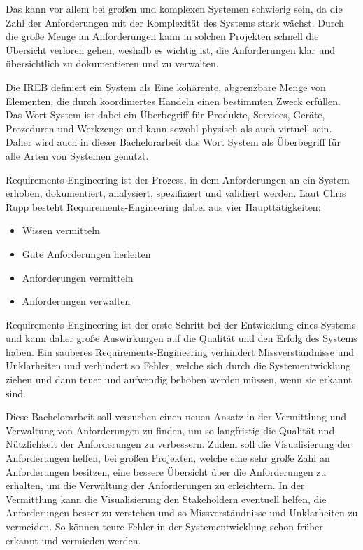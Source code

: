     Das kann vor allem bei großen und komplexen Systemen schwierig sein, da die Zahl der Anforderungen mit der Komplexität des Systems stark wächst.
    Durch die große Menge an Anforderungen kann in solchen Projekten schnell die Übersicht verloren gehen, weshalb es wichtig ist, die Anforderungen klar und übersichtlich zu dokumentieren und zu verwalten.


    Die IREB definiert ein System als \glqq{}Eine kohärente, abgrenzbare Menge von Elementen, die durch koordiniertes Handeln einen bestimmten Zweck erfüllen.\grqq{} \autocite[][]{ireb_cpre_glossary}
    Das Wort System ist dabei ein Überbegriff für Produkte, Services, Geräte, Prozeduren und Werkzeuge und kann sowohl physisch als auch virtuell sein.
    Daher wird auch in dieser Bachelorarbeit das Wort System als Überbegriff für alle Arten von Systemen genutzt.


    Requirements-Engineering ist der Prozess, in dem Anforderungen an ein System erhoben, dokumentiert, analysiert, spezifiziert und validiert werden.
    Laut Chris Rupp besteht Requirements-Engineering dabei aus vier Haupttätigkeiten:
    \begin{itemize}
        \item Wissen vermitteln
        \item Gute Anforderungen herleiten
        \item Anforderungen vermitteln
        \item Anforderungen verwalten
    \end{itemize}
    Requirements-Engineering ist der erste Schritt bei der Entwicklung eines Systems und kann daher große Auswirkungen auf die Qualität und den Erfolg des Systems haben.
    Ein sauberes Requirements-Engineering verhindert Missverständnisse und Unklarheiten und verhindert so Fehler, welche sich durch die Systementwicklung ziehen und dann teuer und aufwendig behoben werden müssen, wenn sie erkannt sind.
    \autocite[][S.20]{Rupp2014}

    Diese Bachelorarbeit soll versuchen einen neuen Ansatz in der Vermittlung und Verwaltung von Anforderungen zu finden, um so langfristig die Qualität und Nützlichkeit der Anforderungen zu verbessern.
    Zudem soll die Visualisierung der Anforderungen helfen, bei großen Projekten, welche eine sehr große Zahl an Anforderungen besitzen, eine bessere Übersicht über die Anforderungen zu erhalten, um die Verwaltung der Anforderungen zu erleichtern.
    In der Vermittlung kann die Visualisierung den Stakeholdern eventuell helfen, die Anforderungen besser zu verstehen und so Missverständnisse und Unklarheiten zu vermeiden.
    So können teure Fehler in der Systementwicklung schon früher erkannt und vermieden werden.
    


